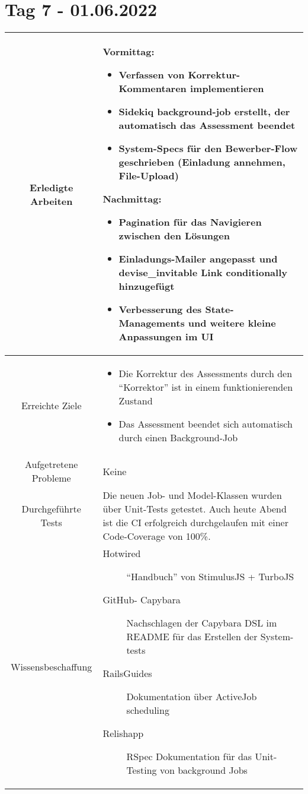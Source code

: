 \section{Tag 7 - 01.06.2022}

\begin{tabularx}{\textwidth}[H]{|c|X|}
    \hline
    Erledigte Arbeiten         &
    \textbf{Vormittag:}
    \begin{itemize}
        \item Verfassen von Korrektur-Kommentaren implementieren
        \item Sidekiq background-job erstellt, der automatisch das Assessment beendet
        \item System-Specs für den Bewerber-Flow geschrieben (Einladung annehmen, File-Upload)
    \end{itemize}
    \textbf{Nachmittag:}
    \begin{itemize}
        \item Pagination für das Navigieren zwischen den Lösungen
        \item Einladungs-Mailer angepasst und devise\_invitable Link conditionally hinzugefügt
        \item Verbesserung des State-Managements und weitere kleine Anpassungen im UI
    \end{itemize}
    \\ \hline

    Erreichte Ziele            &
    \begin{itemize}
        \item Die Korrektur des Assessments durch den \enquote{Korrektor} ist in einem funktionierenden Zustand
        \item Das Assessment beendet sich automatisch durch einen Background-Job
    \end{itemize}
    \\ \hline

    Aufgetretene Probleme      &
    Keine
    \\ \hline

    Durchgeführte Tests        &
    Die neuen Job- und Model-Klassen wurden über Unit-Tests getestet.
    Auch heute Abend ist die CI erfolgreich durchgelaufen mit einer Code-Coverage von 100\%.
    \\ \hline

    Wissensbeschaffung         &
    \begin{description}
        \item[Hotwired] \enquote{Handbuch} von StimulusJS + TurboJS
        \item[GitHub- Capybara] Nachschlagen der Capybara DSL im README für das Erstellen der System-tests
        \item[RailsGuides] Dokumentation über ActiveJob scheduling
        \item[Relishapp] RSpec Dokumentation für das Unit-Testing von background Jobs
    \end{description}
    \\ \hline


\end{tabularx}
